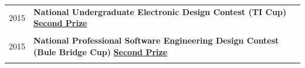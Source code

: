\documentclass[a4paper,10pt]{article} %
\begin{document}
\begin{tabular}{r|l}
2015                     & \textbf{National Undergraduate Electronic Design Contest (TI Cup)} \href{https://way2ml.github.io/_static/cv/2021_11_26_10_electronic_design_contest.pdf}{\textbf{Second Prize}} \\
\multicolumn{2}{c}{} \\	%
2015
                     & \textbf{National Professional Software Engineering Design Contest (Bule Bridge Cup)} \href{https://way2ml.github.io/_static/cv/2021_12_17_17_blue_bredge.pdf}{\textbf{Second Prize}} \\
\multicolumn{2}{c}{} \\	%

\end{tabular}
\end{document}
